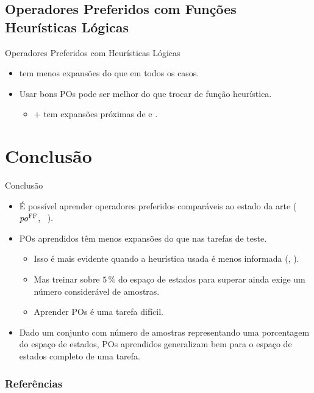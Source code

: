 \documentclass{beamer}
\begin{document}
\subsection{Operadores Preferidos com Funções Heurísticas Lógicas}
\begin{frame}{Operadores Preferidos com Heurísticas Lógicas}

\begin{itemize}
  \item \pog \alert{tem menos expansões do que} \poff em todos os casos.
  \pause
  \item Usar bons POs pode ser \alert{melhor} do que trocar de função heurística.
    \begin{itemize}
       \item \hgc + \pog tem expansões próximas de \hff e \hadd.
    \end{itemize}
\end{itemize}
\end{frame}


\section{Conclusão}
\begin{frame}{Conclusão}
\begin{itemize}
  \item É possível aprender operadores preferidos \alert{comparáveis ao estado da arte} ($po^{\text{FF}}$, ~\cite{Hoffmann.Nebel/2001,Helmert/2006,Richter.Helmert/2009}).
  \pause
  \item POs aprendidos \pog têm \alert{menos expansões} do que \poff nas tarefas de teste.
  \pause
    \begin{itemize}
      \item Isso é mais evidente quando a heurística usada é menos informada (\hgc, \hblind).
      \pause
      \item Mas treinar sobre $5\,\%$ do espaço de estados para superar \poff ainda exige um número considerável de amostras.
      \pause
      \item Aprender POs é uma tarefa \alert{difícil}.
    \end{itemize}
  \pause
  \item Dado um conjunto com número de amostras representando uma porcentagem do espaço de estados, POs aprendidos \alert{generalizam bem} para o espaço de estados completo de uma tarefa.
\end{itemize}
\end{frame}

\begin{frame}[allowframebreaks]
\frametitle{Referências}
\printbibliography
\end{frame}
\end{document}
